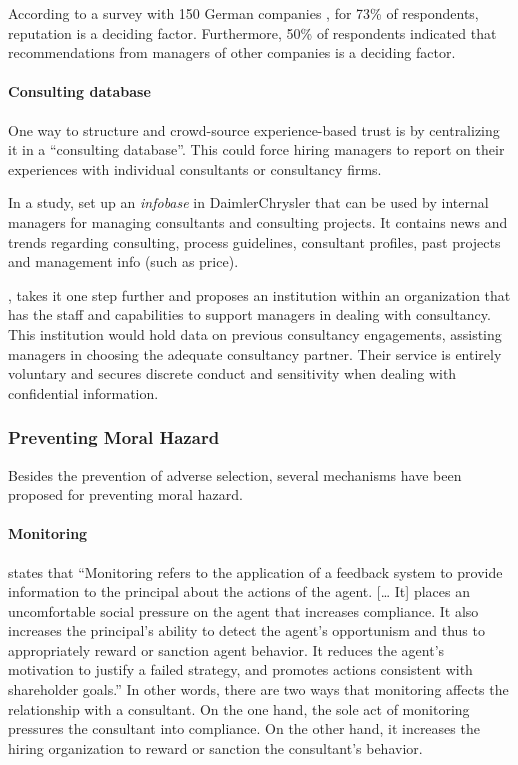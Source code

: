 \documentclass[12pt]{article}
\begin{document}
According to a survey with 150 German companies \citep[ 91]{kieser2006},
for 73\% of respondents, reputation is a deciding factor. Furthermore,
50\% of respondents indicated that recommendations from managers of
other companies is a deciding factor.

\paragraph{Consulting database}\label{consulting-database}

One way to structure and crowd-source experience-based trust is by
centralizing it in a ``consulting database''. This could force hiring
managers to report on their experiences with individual consultants or
consultancy firms.

In a study, \citet{mohe2006} set up an \emph{infobase} in
DaimlerChrysler that can be used by internal managers for managing
consultants and consulting projects. It contains news and trends
regarding consulting, process guidelines, consultant profiles, past
projects and management info (such as price).

\citet[308]{honer2006}, takes it one step further and proposes an
institution within an organization that has the staff and capabilities
to support managers in dealing with consultancy. This institution would
hold data on previous consultancy engagements, assisting managers in
choosing the adequate consultancy partner. Their service is entirely
voluntary and secures discrete conduct and sensitivity when dealing with
confidential information.

\subsubsection{Preventing Moral Hazard}\label{preventing-moral-hazard}

Besides the prevention of adverse selection, several mechanisms have
been proposed for preventing moral hazard.

\paragraph{Monitoring}\label{monitoring}

\citep[ 13]{basu2011} states that ``Monitoring refers to the application
of a feedback system to provide information to the principal about the
actions of the agent. {[}\ldots{} It{]} places an uncomfortable social
pressure on the agent that increases compliance. It also increases the
principal's ability to detect the agent's opportunism and thus to
appropriately reward or sanction agent behavior. It reduces the agent's
motivation to justify a failed strategy, and promotes actions consistent
with shareholder goals.'' In other words, there are two ways that
monitoring affects the relationship with a consultant. On the one hand,
the sole act of monitoring pressures the consultant into compliance. On
the other hand, it increases the hiring organization to reward or
sanction the consultant's behavior.
\end{document}
